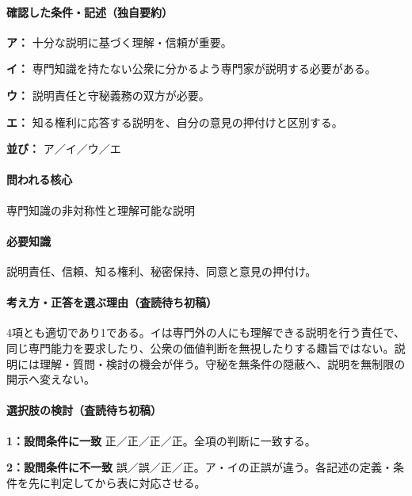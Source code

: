 \paragraph{確認した条件・記述（独自要約）}\mbox{}\par

\noindent\textbf{ア：} 十分な説明に基づく理解・信頼が重要。\par

\noindent\textbf{イ：} 専門知識を持たない公衆に分かるよう専門家が説明する必要がある。\par

\noindent\textbf{ウ：} 説明責任と守秘義務の双方が必要。\par

\noindent\textbf{エ：} 知る権利に応答する説明を、自分の意見の押付けと区別する。\par

\noindent\textbf{並び：} ア／イ／ウ／エ\par

\paragraph{問われる核心} 専門知識の非対称性と理解可能な説明

\paragraph{必要知識} 説明責任、信頼、知る権利、秘密保持、同意と意見の押付け。

\paragraph{考え方・正答を選ぶ理由（査読待ち初稿）} 4項とも適切であり1である。イは専門外の人にも理解できる説明を行う責任で、同じ専門能力を要求したり、公衆の価値判断を無視したりする趣旨ではない。説明には理解・質問・検討の機会が伴う。守秘を無条件の隠蔽へ、説明を無制限の開示へ変えない。

\paragraph{選択肢の検討（査読待ち初稿）}\mbox{}\par

\noindent\textbf{1：設問条件に一致} 正／正／正／正。全項の判断に一致する。\par

\noindent\textbf{2：設問条件に不一致} 誤／誤／正／正。ア・イの正誤が違う。各記述の定義・条件を先に判定してから表に対応させる。\par

